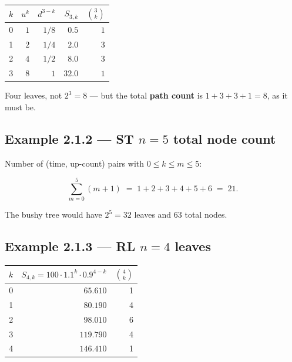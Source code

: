 \documentclass[
  10pt,
  twoside]{book}
\newcounter{none} %
\begin{document}
{\def\LTcaptype{none} %
\begin{table}[H]
\centering
\begin{tabular}{|r|r|r|r|r|}
\toprule
\(k\) & \(u^k\) & \(d^{3-k}\) & \(S_{3,k}\) & \(\binom{3}{k}\) \\
\midrule



0 & \(1\) & \(1/8\) & \(\phantom{0}\mathbf{0.5}\) & \(1\) \\
1 & \(2\) & \(1/4\) & \(\phantom{0}\mathbf{2.0}\) & \(3\) \\
2 & \(4\) & \(1/2\) & \(\phantom{0}\mathbf{8.0}\) & \(3\) \\
3 & \(8\) & \(1\) & \(\mathbf{32.0}\) & \(1\) \\
\bottomrule
\end{tabular}
\end{table}
}

Four leaves, not \(2^3=8\) --- but the total \textbf{path count} is
\(1+3+3+1 = 8\), as it must be.

\subsection{\texorpdfstring{Example 2.1.2 --- ST \(n=5\) total node
count}{Example 2.1.2 --- ST n=5 total node count}}\label{example-2.1.2-st-n5-total-node-count}

Number of (time, up-count) pairs with \(0\le k\le m\le 5\):

\[
\sum_{m=0}^{5}(m+1) \;=\; 1+2+3+4+5+6 \;=\; 21.
\]

The bushy tree would have \(2^5=32\) leaves and \(63\) total nodes.

\subsection{\texorpdfstring{Example 2.1.3 --- RL \(n=4\)
leaves}{Example 2.1.3 --- RL n=4 leaves}}\label{example-2.1.3-rl-n4-leaves}

{\def\LTcaptype{none} %
\begin{table}[H]
\centering
\begin{tabular}{|r|r|r|}
\toprule
\(k\) & \(S_{4,k}=100\cdot 1.1^k\cdot 0.9^{4-k}\) & \(\binom{4}{k}\) \\
\midrule



0 & \(\phantom{0}65.610\) & 1 \\
1 & \(\phantom{0}80.190\) & 4 \\
2 & \(\phantom{0}98.010\) & 6 \\
3 & \(119.790\) & 4 \\
4 & \(146.410\) & 1 \\
\bottomrule
\end{tabular}
\end{table}
}
\end{document}
